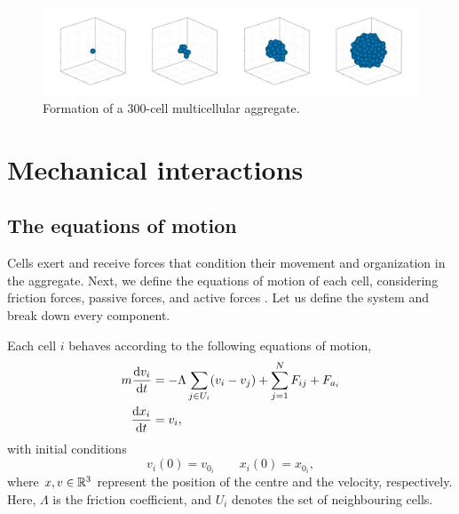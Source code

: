 \begin{figure}[h]
    \centering
    \includegraphics[width=\textwidth]{figures/400/400-aggregate-formation.png}
    \caption{Formation of a 300-cell multicellular aggregate.}
    \label{fig:aggregate-formation}
\end{figure}



\section{Mechanical interactions}

\subsection{The equations of motion}

Cells exert and receive forces that condition their movement and organization in the aggregate. Next, we define the equations of motion of each cell, considering friction forces, passive forces, and active forces \parencite{Liedekerke_2015}. Let us define the system and break down every component.

\begin{definition}
    Each cell $i$ behaves according to the following equations of motion,
    \begin{align}
        \begin{aligned}\label{eq:og_motion}
            m\frac{\mathrm{d} v_i}{\mathrm{d} t} &=-\Lambda\sum_{j\in U_i}(v_i-v_j)+
            \sum_{j=1}^{N} F_{ij} + F_{a_i}\\
            \frac{\mathrm{d} x_i}{\mathrm{d} t} &=v_i,
        \end{aligned}
    \end{align}
    with initial conditions
    \begin{equation}
        v_i(0) = v_{0_i} \qquad x_i(0) = x_{0_i},
    \end{equation}
    where $x,v\in\mathbb{R}^3$ represent the position of the centre and the velocity, respectively. Here, $\Lambda$ is the friction coefficient, and $U_i$ denotes the set of neighbouring cells.
\end{definition}

